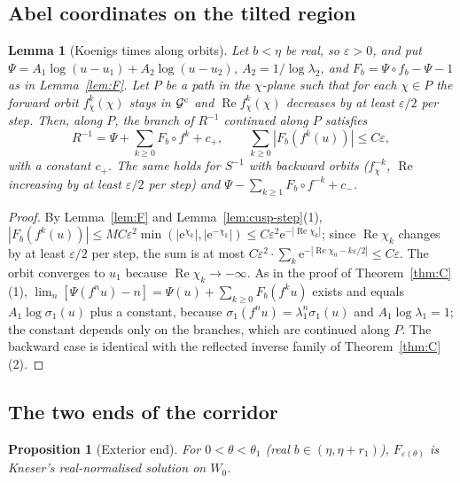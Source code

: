 \documentclass[11pt]{amsart}
\newtheorem{proposition}[theorem]{Proposition}
\newtheorem{lemma}[theorem]{Lemma}
\theoremstyle{definition}
\newcommand{\Rr}{R}
\newcommand{\eee}{\mathrm{e}}
\begin{document}
\subsection{Abel coordinates on the tilted region}

\begin{lemma}[Koenigs times along orbits]\label{lem:cusp-abel}
Let $b<\eta$ be real, so $\varepsilon>0$, and put
$\Psi=A_1\log(u-u_1)+A_2\log(u-u_2)$, $A_2=1/\log\lambda_2$, and
$F_b=\Psi\circ f_b-\Psi-1$ as in Lemma~\ref{lem:F}.  Let $P$ be a path in the
$\chi$-plane such that for each $\chi\in P$ the forward orbit $f_\chi^k(\chi)$ stays in
$\mathcal G^{\rm c}$ and $\operatorname{Re}f_\chi^k(\chi)$ decreases by at least $\varepsilon/2$ per step.  Then, along
$P$, the branch of $\Rr^{-1}$ continued along $P$ satisfies
\[
 \Rr^{-1}=\Psi+\sum_{k\ge0}F_b\circ f^k+c_+,\qquad
 \sum_{k\ge0}|F_b(f^k(u))|\le C\varepsilon,
\]
with a constant $c_+$.  The same holds for $S^{-1}$ with backward orbits
($f_\chi^{-k}$, $\operatorname{Re}$ increasing by at least $\varepsilon/2$ per step) and
$\Psi-\sum_{k\ge1}F_b\circ f^{-k}+c_-$.
\end{lemma}

\begin{proof}
By Lemma~\ref{lem:F} and Lemma~\ref{lem:cusp-step}(1),
$|F_b(f^k(u))|\le MC\varepsilon^2\min(|\eee^{\chi_k}|,|\eee^{-\chi_k}|)\le C\varepsilon^2\eee^{-|\operatorname{Re}\chi_k|}$;
since $\operatorname{Re}\chi_k$ changes by at least $\varepsilon/2$ per step, the sum is at most
$C\varepsilon^2\cdot\sum_k\eee^{-|\operatorname{Re}\chi_0-k\varepsilon/2|}\le C\varepsilon$.  The orbit converges to $u_1$
because $\operatorname{Re}\chi_k\to-\infty$.  As in the proof of Theorem~\ref{thm:C}(1),
$\lim_n[\Psi(f^nu)-n]=\Psi(u)+\sum_{k\ge0}F_b(f^ku)$ exists and equals
$A_1\log\sigma_1(u)$ plus a constant, because $\sigma_1(f^nu)=\lambda_1^n\sigma_1(u)$ and
$A_1\log\lambda_1=1$; the constant depends only on the branches, which are
continued along $P$.  The backward case is identical with the reflected
inverse family of Theorem~\ref{thm:C}(2).
\end{proof}

\subsection{The two ends of the corridor}

\begin{proposition}[Exterior end]\label{prop:cusp-exterior}
For $0<\theta<\theta_1$ (real $b\in(\eta,\eta+r_1)$), $F_{\varepsilon(\theta)}$ is Kneser's
real-normalised solution on $W_0$.
\end{proposition}
\end{document}
